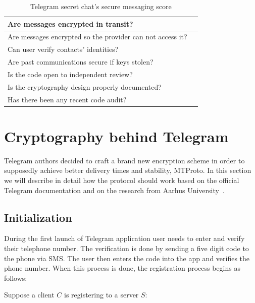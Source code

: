 \documentclass[thesis=M,english]{FITthesis}[2012/10/20]
\newcommand{\cmark}{\ding{51}}%
\begin{document}
\begin{table}[H]
	\centering
	\caption{Telegram secret chat's secure messaging score}
	\label{tab:telegram-secret-eff}
	\begin{tabular}{|l|l|}
		\hline
		Are messages encrypted in transit? & \cmark \\\hline
		Are messages encrypted so the provider can not access it? & \cmark \\ \hline
		Can user verify contacts' identities? & \cmark \\ \hline
		Are past communications secure if keys stolen? & \cmark \\ \hline
		Is the code open to independent review? & \cmark \\ \hline
		Is the cryptography design properly documented? & \cmark \\ \hline
		Has there been any recent code audit? & \cmark \\ \hline
	\end{tabular}
\end{table}







\chapter{Cryptography behind Telegram}\label{telegramcrypto}

Telegram authors decided to craft a brand new encryption scheme in order to supposedly achieve better delivery times and stability, MTProto. In this section we will describe in detail how the protocol should work based on the official Telegram documentation and on the research from Aarhus University~\cite{telegram-aarhus}.


\section{Initialization}\label{crypto-initialization}

During the first launch of Telegram application user needs to enter and verify their telephone number. The verification is done by sending a five digit code to the phone via SMS. The user then enters the code into the app and verifies the phone number. When this process is done, the registration process begins as follows:

Suppose a client $C$ is registering to a server $S$:
\end{document}
